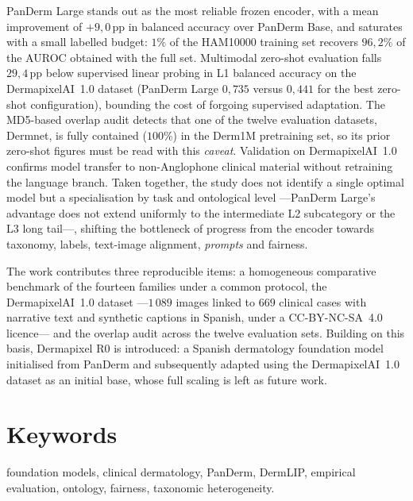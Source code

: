 PanDerm Large stands out as the most reliable frozen encoder, with a
mean improvement of $+9{,}0$\,pp in balanced accuracy over PanDerm
Base, and saturates with a small labelled budget: $1\%$ of the
HAM10000 training set recovers $96{,}2\%$ of the AUROC obtained with
the full set. Multimodal zero-shot evaluation falls $29{,}4$\,pp
below supervised linear probing in L1 balanced accuracy on the
DermapixelAI~1.0 dataset (PanDerm Large $0{,}735$ versus $0{,}441$
for the best zero-shot configuration), bounding the cost of forgoing
supervised adaptation. The MD5-based overlap audit detects that one
of the twelve evaluation datasets, Dermnet, is fully contained
($100\%$) in the Derm1M pretraining set, so its prior zero-shot
figures must be read with this \emph{caveat}. Validation on
DermapixelAI~1.0 confirms model transfer to non-Anglophone clinical
material without retraining the language branch. Taken together, the
study does not identify a single optimal model but a specialisation
by task and ontological level ---PanDerm Large's advantage does not
extend uniformly to the intermediate L2 subcategory or the L3 long
tail---, shifting the bottleneck of progress from the encoder towards
taxonomy, labels, text-image alignment, \emph{prompts} and fairness.

The work contributes three reproducible items: a homogeneous
comparative benchmark of the fourteen families under a common
protocol, the DermapixelAI~1.0 dataset ---$1\,089$ images linked to
$669$ clinical cases with narrative text and synthetic captions in
Spanish, under a CC-BY-NC-SA~4.0 licence--- and the overlap audit
across the twelve evaluation sets. Building on this basis,
Dermapixel R0 is introduced: a Spanish dermatology foundation model
initialised from PanDerm and subsequently adapted using the
DermapixelAI~1.0 dataset as an initial base, whose full scaling is
left as future work.

\vspace*{-0.4cm}
\section*{Keywords}
foundation models, clinical dermatology, PanDerm, DermLIP, empirical
evaluation, ontology, fairness, taxonomic heterogeneity.
